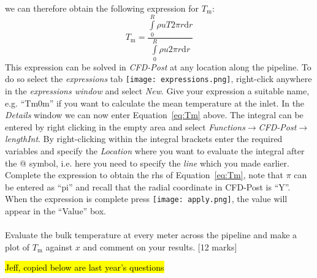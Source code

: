 \documentclass[11pt,a4paper,oneside]{scrartcl}
\begin{document}
\begin{enumerate}
\begin{equation}
    \end{equation}
    we can therefore obtain the following expression for $T_\mathrm{m}$:
    \begin{equation}\label{eq:Tm}
        T_\mathrm{m}=\frac{\int\limits_0^R\rho uT2\pi r\mathrm{d}r}{\int\limits_0^R\rho u 2\pi r \mathrm{d}r}
    \end{equation}
    This expression can be solved in \emph{CFD-Post} at any location along the pipeline. To do so select the \emph{expressions} tab \texttt{[image: expressions.png]}, right-click anywhere in the \emph{expressions window} and select \emph{New}. Give your expression a suitable name, e.g. ``Tm0m'' if you want to calculate the mean temperature at the inlet. In the \emph{Details} window we can now enter Equation~\ref{eq:Tm} above. The integral can be entered by right clicking in the empty area and select \emph{Functions$\rightarrow$CFD-Post$\rightarrow$lengthInt}. By right-clicking within the integral brackets enter the required variables and specify the \emph{Location} where you want to evaluate the integral after the @ symbol, i.e. here you need to specify the \emph{line} which you made earlier. Complete the expression to obtain the rhs of Equation~\ref{eq:Tm}, note that $\pi$ can be entered as ``pi'' and recall that the radial coordinate in CFD-Post is ``Y''. When the expression is complete press \texttt{[image: apply.png]}, the value will appear in the ``Value'' box.
    \\
    \\
    Evaluate the bulk temperature at every meter across the pipeline and make a plot of $T_\mathrm{m}$ against $x$ and comment on your results. [12 marks]
\end{enumerate}

\hl{Jeff, copied below are last year's questions}
\end{document}
